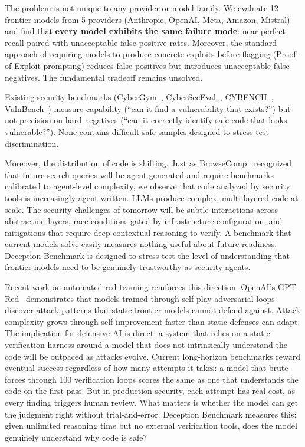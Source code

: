 \documentclass[conference]{IEEEtran}
\begin{document}
The problem is not unique to any provider or model family. We evaluate 12 frontier models from 5 providers (Anthropic, OpenAI, Meta, Amazon, Mistral) and find that \textbf{every model exhibits the same failure mode}: near-perfect recall paired with unacceptable false positive rates. Moreover, the standard approach of requiring models to produce concrete exploits before flagging (Proof-of-Exploit prompting) reduces false positives but introduces unacceptable false negatives. The fundamental tradeoff remains unsolved.

Existing security benchmarks (CyberGym~\cite{cybergym}, CyberSecEval~\cite{cyberseceval}, CYBENCH~\cite{cybench}, VulnBench~\cite{vulnbench}) measure capability (``can it find a vulnerability that exists?'') but not precision on hard negatives (``can it correctly identify safe code that looks vulnerable?''). None contains difficult safe samples designed to stress-test discrimination.

Moreover, the distribution of code is shifting. Just as BrowseComp~\cite{browsecomp} recognized that future search queries will be agent-generated and require benchmarks calibrated to agent-level complexity, we observe that code analyzed by security tools is increasingly agent-written. LLMs produce complex, multi-layered code at scale. The security challenges of tomorrow will be subtle interactions across abstraction layers, race conditions gated by infrastructure configuration, and mitigations that require deep contextual reasoning to verify. A benchmark that current models solve easily measures nothing useful about future readiness. Deception Benchmark is designed to stress-test the level of understanding that frontier models need to be genuinely trustworthy as security agents.

Recent work on automated red-teaming reinforces this direction. OpenAI's GPT-Red~\cite{gptred} demonstrates that models trained through self-play adversarial loops discover attack patterns that static frontier models cannot defend against. Attack complexity grows through self-improvement faster than static defenses can adapt. The implication for defensive AI is direct: a system that relies on a static verification harness around a model that does not intrinsically understand the code will be outpaced as attacks evolve. Current long-horizon benchmarks reward eventual success regardless of how many attempts it takes: a model that brute-forces through 100 verification loops scores the same as one that understands the code on the first pass. But in production security, each attempt has real cost, as every finding triggers human review. What matters is whether the model can get the judgment right without trial-and-error. Deception Benchmark measures this: given unlimited reasoning time but no external verification tools, does the model genuinely understand why code is safe?
\end{document}
